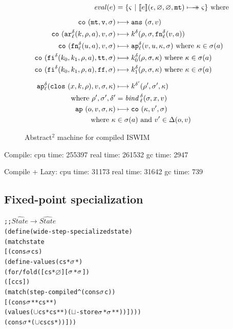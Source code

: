 \documentclass[preprint,onecolumn,9pt]{sigplanconf} %
\begin{document}
\begin{figure}
\begin{align*}
\mathit{eval}(\mexp) &= \{ \mstate\ |\ \compile{\mexp}(\epsilon,\varnothing,\varnothing,\kmt) \multimachstep \mstate \} \text{ where }
\\[2mm]
\co{\kmt,\mval,\msto} &\machstep
\ans{\msto,\mval}
\\
\co{\kar[^\mcntr_\mlab]{\mcomp,\menv,\maddr},\mval,\msto} & \machstep
\mcomp^\mcntr(\menv,\msto,\kfn[^\mcntr_\mlab]{\mval,\maddr})
\\
\co{\kfn[^\mcntr_\mlab]{{\mvalx{u}},\maddr},\mval,\msto} & \machstep
\ap[^\mcntr_\mlab]{\mval,\mvalx{u},\mkont,\msto}
\text{ where }\mkont \in \msto(\maddr)
\\
\co{\kif[^\mcntr]{\mcompi0,\mcompi1,\menv,\maddr},\strue,\msto} & \machstep
\mcompi0^\mcntr(\menv,\msto,\mkont)
\text{ where }\mkont\in\msto(\maddr)
\\
\co{\kif[^\mcntr]{\mcompi0,\mcompi1,\menv,\maddr},\sfalse,\msto} & \machstep
\mcompi1^\mcntr(\menv,\msto,\mkont)
\text{ where }\mkont\in\msto(\maddr)
\\[2mm]
\ap[^\mcntr_\mlab]{\clos{\mvar,\mcomp,\menv},\mval,\msto,\mkont} & \machstep
\mcomp^{\mcntr'}(\menv',\msto',\mkont) \\
\text{ where }\menv',\msto',\mcntr' &= \mathit{bind\,}^{ \mcntr}_\mlab(\msto,\mvar,\mval)
\\
\ap{\mop,\mval,\msto,\mkont} & \machstep
\co{\mkont,\mval',\msto} \\
\text{ where }\mkont &\in\msto(\maddr)
\text{ and } \mval'\in\interpdelta(\mop,\mval)
\end{align*}
\caption{Abstract$^2$ machine for compiled ISWIM}
\label{fig:caam}
\end{figure}


Compile:
   cpu time: 255397 real time: 261532 gc time: 2947

\noindent
Compile + Lazy:
   cpu time: 31173 real time: 31642 gc time: 739

\newpage
\subsection{Fixed-point specialization}

\begin{alltt}
;; \(\widehat{State} \to \widehat{State}\)
(define (wide-step-specialized state)
  (match state
    [(cons \(\msto\) cs)
     (define-values (cs* \(\msto\)*)
       (for/fold ([cs* \(\varnothing\)] [\(\msto\)* \(\msto\)])
         ([c cs])
         (match (step-compiled^ (cons \(\msto\) c))
           [(cons \(\msto\)** cs**)
            (values (\(\cup\) cs* cs**) (\(\sqcup\)-store \(\msto\)* \(\msto\)**))])))
     (cons \(\msto\)* (\(\cup\) cs cs*))]))
\end{alltt}
\end{document}
